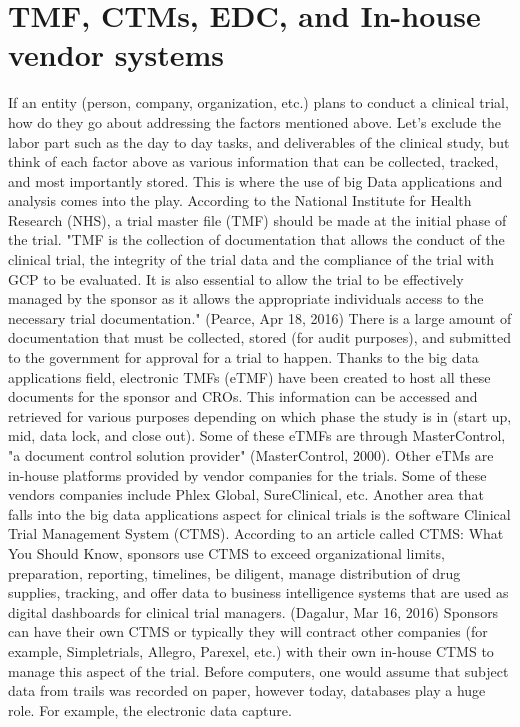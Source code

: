 \documentclass[sigconf]{acmart}
\begin{document}
\section{TMF, CTMs, EDC, and In-house vendor systems}
If an entity (person, company, organization, etc.) plans to conduct a clinical trial, how do they go about addressing the
factors mentioned above. Let's exclude the labor part such as the day to day tasks, and deliverables of the clinical study, but think of each factor above as various information that can be collected, tracked, and most importantly stored. 
This is where the use of big Data applications and analysis comes into the play. 
According to the National Institute for Health Research (NHS), a trial master file (TMF) should be made at the initial phase of the trial. "TMF is the collection of documentation that allows the conduct of the clinical trial, the integrity of the trial data and the compliance of the trial with GCP to be evaluated.
It is also essential to allow the trial to be effectively managed by the sponsor as it allows the appropriate individuals access to the necessary trial documentation." (Pearce, Apr 18, 2016) 
There is a large amount of documentation that must be collected, stored (for audit purposes), and submitted to the government for approval for a trial to happen. 
Thanks to the big data applications field, electronic TMFs (eTMF) have been created to host all these documents for the sponsor and CROs. This information can be accessed and retrieved for various purposes depending on which phase the study is in (start up, mid, data lock, and close out). 
Some of these eTMFs are through MasterControl, "a document control solution provider" (MasterControl, 2000). Other eTMs are in-house platforms provided by vendor companies for the trials. 
Some of these vendors companies include Phlex Global, SureClinical, etc.
Another area that falls into the big data applications aspect for clinical trials is the software Clinical Trial Management System (CTMS).
According to an article called CTMS: What You Should Know, sponsors use CTMS to exceed organizational limits, preparation, reporting, timelines, be diligent, manage distribution of drug supplies, tracking, and offer data to business intelligence systems that are used as digital dashboards for clinical trial managers. (Dagalur, Mar 16, 2016) 
Sponsors can have their own CTMS or typically they will contract other companies (for example, Simpletrials, Allegro, Parexel, etc.) with their own in-house CTMS to manage this aspect of the trial. 
Before computers, one would assume that subject data from trails was recorded on paper, however today, databases play a huge role. For example, the electronic data capture.
\end{document}
